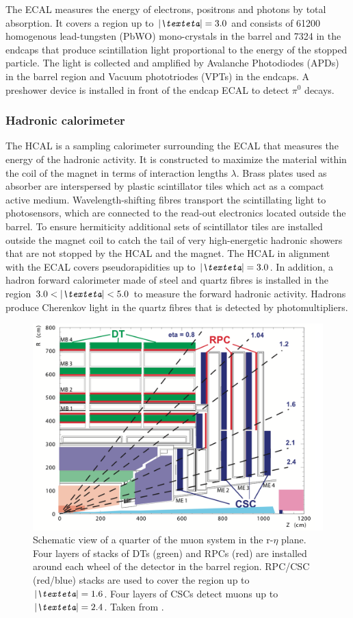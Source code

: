 The ECAL measures the energy of electrons, positrons and photons by total absorption. It covers a region up to $\abs{\eta}=\text{3.0}$ and consists of
61200 homogenous lead-tungsten (PbWO) mono-crystals in the barrel and 7324 in the endcaps that produce scintillation light proportional to the energy of the stopped particle. The light
is collected and amplified by Avalanche Photodiodes (APDs) in the barrel region and Vacuum phototriodes (VPTs) in the endcaps. A preshower
device is installed in front of the endcap ECAL to detect $\pi^0$ decays. 

\subsubsection{Hadronic calorimeter}
The HCAL is a sampling calorimeter surrounding the ECAL that measures the energy of the hadronic activity. It is constructed to maximize the 
material within the coil of the magnet in terms of interaction lengths $\lambda$. Brass plates used as absorber are interspersed by plastic scintillator tiles 
which act as a compact active medium. Wavelength-shifting fibres transport the scintillating light to photosensors, which are connected to the read-out electronics located outside the 
barrel. To ensure hermiticity additional sets of scintillator tiles are installed outside the magnet coil to catch the tail of very high-energetic hadronic showers that are not stopped by the HCAL and the magnet. 
The HCAL in alignment with the ECAL covers pseudorapidities up to $\abs{\eta}=\text{3.0}$. In addition, a hadron forward calorimeter
made of steel and quartz fibres is installed in the region $\text{3.0}<\abs{\eta}<\text{5.0}$ to measure the forward hadronic activity.
Hadrons produce Cherenkov light in the quartz fibres that is detected by photomultipliers. 

\begin{figure}[h!]
    \centering
    \includegraphics[width=.6\textwidth]{Figures/setup/muon_system}
    \caption[Muon chamber schematic view.]{Schematic view of a quarter of the muon system in the $\text{r-}\eta$ plane. Four layers of stacks of DTs (green) and RPCs (red) are installed around each wheel of the detector in the barrel region.
    RPC/CSC (red/blue) stacks are used to cover the region up to $\abs{\eta}=\text{1.6}$. Four layers of CSCs detect muons up to $\abs{\eta}=\text{2.4}$. Taken from \cite{CmsTdr1}.}\label{CMS:muon_system}
\end{figure}
 
